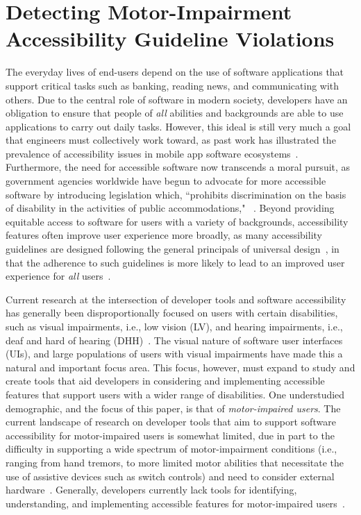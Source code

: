 \section{Detecting Motor-Impairment Accessibility Guideline Violations}
\label{sec:MotorEase}

The everyday lives of end-users depend on the use of software applications that support critical tasks such as banking, reading news, and communicating with others. Due to the central role of software in modern society, developers have an obligation to ensure that people of \textit{all} abilities and backgrounds are able to use applications to carry out daily tasks. However, this ideal is still very much a goal that engineers must collectively work toward, as past work has illustrated the prevalence of accessibility issues in mobile app software ecosystems~\cite{Alshayban20,Vendome19,Chen22}. Furthermore, the need for accessible software now transcends a moral pursuit, as government agencies worldwide have begun to advocate for more accessible software by introducing legislation which, ``prohibits discrimination on the basis of disability in the activities of public accommodations," ~\cite{ADALaws}. 
Beyond providing equitable access to software for users with a variety of backgrounds, accessibility features often improve user experience more broadly, as many accessibility guidelines are designed following the general principals of universal design~\cite{univ-design}, in that the adherence to such guidelines is more likely to lead to an improved user experience for \textit{all} users~\cite{Sarsenbayeva22}. 

Current research at the intersection of developer tools and software accessibility has generally been disproportionally focused on users with certain disabilities, such as visual impairments, i.e., low vision (LV), and hearing impairments, i.e., deaf and hard of hearing (DHH)~\cite{Park14,Zhang21,Gajos07,Vendome19, Chen22}. The visual nature of software user interfaces (UIs), and large populations of users with visual impairments have made this a natural and important focus area. This focus, however, must expand to study and create tools that aid developers in considering and implementing accessible features that support users with a wider range of disabilities. One understudied demographic, and the focus of this paper, is that of \textit{motor-impaired users}. The current landscape of research on developer tools that aim to support software accessibility for motor-impaired users is somewhat limited, due in part to the difficulty in supporting a wide spectrum of motor-impairment conditions (i.e., ranging from hand tremors, to more limited motor abilities that necessitate the use of assistive devices such as switch controls) and need to consider external hardware~\cite{Sarsenbayeva22}. Generally, developers currently lack tools for identifying, understanding, and implementing accessible features for motor-impaired users~\cite{Alshayban20}. 


